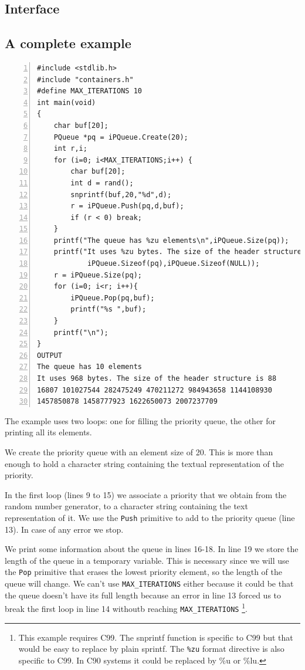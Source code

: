 \documentclass[12pt,a4paper]{memoir} %
\begin{document}
{{\subsection{Interface}

\subsection{A complete example}
\begin{Verbatim}[numbers=left]
#include <stdlib.h>
#include "containers.h"
#define MAX_ITERATIONS 10
int main(void)
{
    char buf[20];
    PQueue *pq = iPQueue.Create(20);
    int r,i;
    for (i=0; i<MAX_ITERATIONS;i++) {
        char buf[20];
        int d = rand();
        snprintf(buf,20,"%d",d);
        r = iPQueue.Push(pq,d,buf);
        if (r < 0) break;
    }
    printf("The queue has %zu elements\n",iPQueue.Size(pq));
    printf("It uses %zu bytes. The size of the header structure is %zu\n",
            iPQueue.Sizeof(pq),iPQueue.Sizeof(NULL));
    r = iPQueue.Size(pq);
    for (i=0; i<r; i++){
        iPQueue.Pop(pq,buf);
        printf("%s ",buf);
    }
    printf("\n");
}
OUTPUT
The queue has 10 elements
It uses 968 bytes. The size of the header structure is 88
16807 101027544 282475249 470211272 984943658 1144108930 
1457850878 1458777923 1622650073 2007237709
\end{Verbatim}
The example uses two loops: one for filling the priority queue, the other for printing all its elements. 

We create the priority queue
with an element size of 20. This is more than enough to hold a character string containing the textual representation of the priority.

In the first loop (lines 9 to 15) we associate a priority that we obtain from the random number generator, to a character string containing
the text representation of it. We use the \verb,Push, primitive to add to the priority queue (line 13). In case of any error we stop. 

We print some information about the queue in lines 16-18. In line 19 we store the length of the queue in a temporary variable.
This is necessary since we will use the \verb,Pop, primitive that erases the lowest priority element, so the length of the queue will
change. We can't use \verb,MAX_ITERATIONS, either because it could be that the queue doesn't have its full length because an error
in line 13 forced us to break the first loop in line 14 withoutb reaching \verb,MAX_ITERATIONS,
\footnote{This example requires C99. The snprintf function is specific to C99 but that would be easy to replace by plain sprintf. The 
\verb,%zu, format directive is also specific to C99. In C90 systems it could be replaced by \%u or \%lu.
}.

}}
\end{document}

